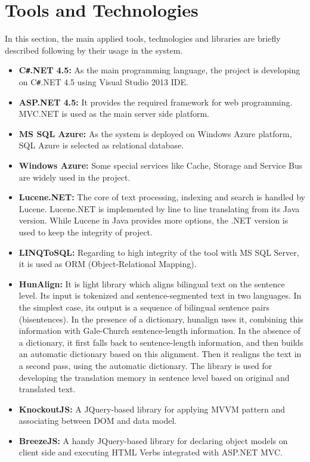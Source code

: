 \section{Tools and Technologies}
In this section, the main applied tools, technologies and libraries are briefly described following by their usage in the system.

\begin{itemize}
	\item \textbf{C\texttt{\#}.NET 4.5:} As the main programming language, the project is developing on C\texttt{\#}.NET 4.5 using Visual Studio 2013 IDE.
	\item \textbf{ASP.NET 4.5:} It provides the required framework for web programming. MVC.NET is used as the main server side platform.
	\item \textbf{MS SQL Azure:} As the system is deployed on Windows Azure platform, SQL Azure is selected as relational database.
	\item \textbf{Windows Azure:} Some special services like Cache, Storage and Service Bus are widely used in the project.
	\item \textbf{Lucene.NET:} The core of text processing, indexing and search is handled by Lucene. Lucene.NET is implemented by line to line translating from its Java version. While Lucene in Java provides more options, the .NET version is used to keep the integrity of project.
	\item \textbf{LINQToSQL:} Regarding to high integrity of the tool with MS SQL Server, it is used as ORM (Object-Relational Mapping).
	\item \textbf{HunAlign\cite{hunalign}:} It is light library which aligns bilingual text on the sentence level. Its input is tokenized and sentence-segmented text in two languages. In the simplest case, its output is a sequence of bilingual sentence pairs (bisentences). In the presence of a dictionary, hunalign uses it, combining this information  with Gale-Church sentence-length information. In the absence of a dictionary, it first falls back to sentence-length information, and then builds an automatic dictionary based on this alignment. Then it realigns the text in a second pass, using the automatic dictionary. The library is used for developing the translation memory in sentence level based on original and translated text.
	\item \textbf{KnockoutJS:} A JQuery-based library for applying MVVM pattern and associating between DOM and data model.
	\item \textbf{BreezeJS:} A handy JQuery-based library for declaring object models on client side and executing HTML Verbs integrated with ASP.NET MVC.

\end{itemize}
